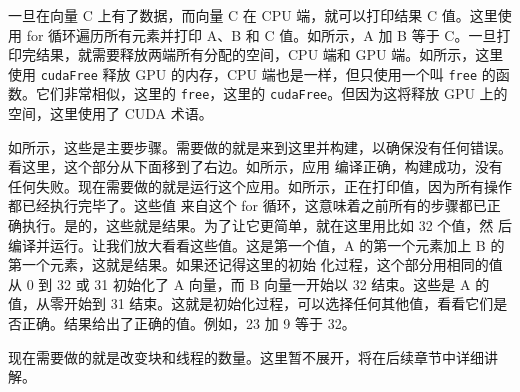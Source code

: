 一旦在向量 C 上有了数据，而向量 C 在 CPU 端，就可以打印结果 C 值。这里使用 for 循环遍历所有元素并打印 A、B 和 C 
值。如所示，A 加 B 等于 C。一旦打印完结果，就需要释放两端所有分配的空间，CPU 端和 GPU 端。如所示，这里使用 
\texttt{cudaFree} 释放 GPU 的内存，CPU 端也是一样，但只使用一个叫 \texttt{free} 的函数。它们非常相似，这里的 
\texttt{free}，这里的 \texttt{cudaFree}。但因为这将释放 GPU 上的空间，这里使用了 CUDA 术语。

如所示，这些是主要步骤。需要做的就是来到这里并构建，以确保没有任何错误。看这里，这个部分从下面移到了右边。如所示，应用
编译正确，构建成功，没有任何失败。现在需要做的就是运行这个应用。如所示，正在打印值，因为所有操作都已经执行完毕了。这些值
来自这个 for 循环，这意味着之前所有的步骤都已正确执行。是的，这些就是结果。为了让它更简单，就在这里用比如 32 个值，然
后编译并运行。让我们放大看看这些值。这是第一个值，A 的第一个元素加上 B 的第一个元素，这就是结果。如果还记得这里的初始
化过程，这个部分用相同的值从 0 到 32 或 31 初始化了 A 向量，而 B 向量一开始以 32 结束。这些是 A 的值，从零开始到 31 
结束。这就是初始化过程，可以选择任何其他值，看看它们是否正确。结果给出了正确的值。例如，23 加 9 等于 32。

现在需要做的就是改变块和线程的数量。这里暂不展开，将在后续章节中详细讲解。

